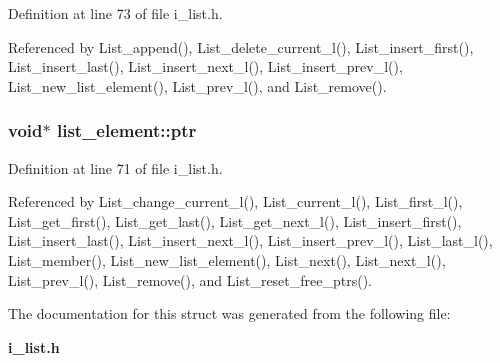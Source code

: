 Definition at line 73 of file i\_\-list.h.

Referenced by List\_\-append(), List\_\-delete\_\-current\_\-l(), List\_\-insert\_\-first(), List\_\-insert\_\-last(), List\_\-insert\_\-next\_\-l(), List\_\-insert\_\-prev\_\-l(), List\_\-new\_\-list\_\-element(), List\_\-prev\_\-l(), and List\_\-remove().
\subsubsection{\setlength{\rightskip}{0pt plus 5cm}void$\ast$ \bf{list\_\-element::ptr}}\label{structlist__element_5ddec446cafb52e393a1b33dc9373a19}




Definition at line 71 of file i\_\-list.h.

Referenced by List\_\-change\_\-current\_\-l(), List\_\-current\_\-l(), List\_\-first\_\-l(), List\_\-get\_\-first(), List\_\-get\_\-last(), List\_\-get\_\-next\_\-l(), List\_\-insert\_\-first(), List\_\-insert\_\-last(), List\_\-insert\_\-next\_\-l(), List\_\-insert\_\-prev\_\-l(), List\_\-last\_\-l(), List\_\-member(), List\_\-new\_\-list\_\-element(), List\_\-next(), List\_\-next\_\-l(), List\_\-prev\_\-l(), List\_\-remove(), and List\_\-reset\_\-free\_\-ptrs().

The documentation for this struct was generated from the following file:\begin{CompactItemize}
\item 
\bf{i\_\-list.h}\end{CompactItemize}
